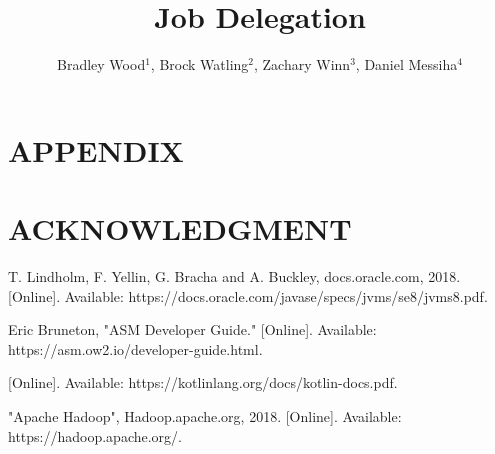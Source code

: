 \documentclass[letterpaper, 11 pt, conference]{ieeeconf}
\title{Job Delegation}
\author{Bradley Wood$^{1}$, Brock Watling$^{2}$, Zachary Winn$^{3}$, Daniel Messiha$^{4}$}
\begin{document}
    \maketitle
    \thispagestyle{empty}
    \pagestyle{empty}

    

    

    

    

    

    

    

    

    

    

    \addtolength{\textheight}{-12cm}   %

    \section*{APPENDIX}

    \section*{ACKNOWLEDGMENT}


    \begin{thebibliography}{99}

        T. Lindholm, F. Yellin, G. Bracha and A. Buckley, docs.oracle.com, 2018. [Online].
        Available: https://docs.oracle.com/javase/specs/jvms/se8/jvms8.pdf.

        Eric Bruneton, "ASM Developer Guide." [Online].
        Available: https://asm.ow2.io/developer-guide.html.

        [Online].
        Available: https://kotlinlang.org/docs/kotlin-docs.pdf.

        "Apache Hadoop", Hadoop.apache.org, 2018. [Online].
        Available: https://hadoop.apache.org/.


    \end{thebibliography}
\end{document}

